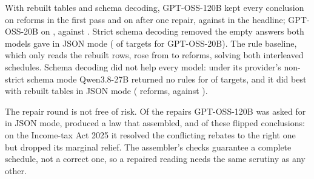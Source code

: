 \documentclass[sn-apa]{sn-jnl}
\begin{document}
With rebuilt tables and schema decoding, GPT-OSS-120B kept every conclusion
on  reforms in the first pass
and on  after one repair,
against  in the headline; GPT-OSS-20B on
, against
. Strict schema decoding removed the
empty answers both models gave in JSON mode
( of
 targets for GPT-OSS-20B). The rule
baseline, which only reads the rebuilt rows, rose from
 to  reforms,
solving both interleaved schedules. Schema decoding did not help every
model: under its provider's non-strict schema mode Qwen3.8-27B returned no
rules for  of
 targets, and it did best with
rebuilt tables in JSON mode (
reforms, against ).

The repair round is not free of risk. Of the
 repairs GPT-OSS-120B was asked for
in JSON mode,  produced a law
that assembled, and  of these
flipped conclusions: on the Income-tax Act 2025 it resolved the conflicting
rebates to the right one but dropped its marginal relief. The assembler's checks guarantee a
complete schedule, not a correct one, so a repaired reading needs the same
scrutiny as any other.
\end{document}
